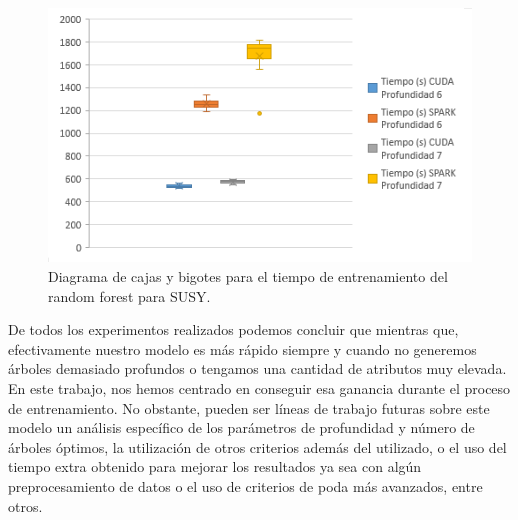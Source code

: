 \begin{figure}[ht]
\centering
\includegraphics[scale=1.0]{imagenes/boxplot_rf.png}
\caption{Diagrama de cajas y bigotes para el tiempo de entrenamiento del random forest para SUSY.}
\label{img:boxplot}
\end{figure}

De todos los experimentos realizados podemos concluir que mientras que, efectivamente nuestro modelo es más rápido siempre y cuando no generemos árboles demasiado profundos o tengamos una cantidad de atributos muy elevada. En este trabajo, nos hemos centrado en conseguir esa ganancia durante el proceso de entrenamiento. No obstante, pueden ser líneas de trabajo futuras sobre este modelo un análisis específico de los parámetros de profundidad y número de árboles óptimos, la utilización de otros criterios además del utilizado, o el uso del tiempo extra obtenido para mejorar los resultados ya sea con algún preprocesamiento de datos o el uso de criterios de poda más avanzados, entre otros.